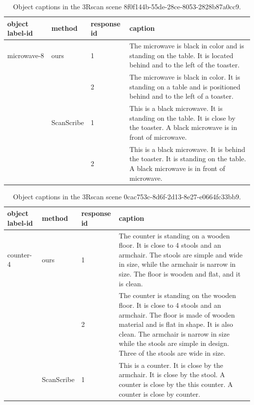 \begin{table}[htbp]
\centering
\caption{Object captions in the 3Rscan scene 8f0f144b-55de-28ce-8053-2828b87a0cc9.}
\label{tab:grammar_compare_1}
\begin{tabular}{@{}l|l|l|p{10cm}}
\toprule
object label-id & method     & response id & caption                                                                                      \\ \midrule
microwave-8     & ours       & 1           & The microwave is black in color and is standing on the table. It is located behind and to the left of the toaster. \\ \cmidrule(lr){3-4}
                &            & 2           & The microwave is black in color. It is standing on a table and is positioned behind and to the left of a toaster.   \\ \cmidrule(lr){2-4}
                & ScanScribe & 1           & This is a black microwave. It is standing on the table. It is close by the toaster. A black microwave is in front of {\color{red}{the this}} microwave. \\ \cmidrule(lr){3-4}
                &            & 2           & This is a black microwave. It is behind the toaster. It is standing on the table. A black microwave is in front of {\color{red}{the this}} microwave.   \\ \bottomrule
\end{tabular}
\end{table}


\begin{table}[htbp]
\centering
\caption{Object captions in the 3Rscan scene 0cac753c-8d6f-2d13-8e27-e0664fc33bb9.}
\label{tab:grammar_compare_2}
\begin{tabular}{@{}l|l|l|p{10cm}}
\toprule
object label-id & method     & response id & caption                                                                                      \\ \midrule
counter-4    & ours       & 1           & The counter is standing on a wooden floor. It is close to 4 stools and an armchair. The stools are simple and wide in size, while the armchair is narrow in size. The floor is wooden and flat, and it is clean. \\ \cmidrule(lr){3-4}
                &            & 2           & The counter is standing on the wooden floor. It is close to 4 stools and an armchair. The floor is made of wooden material and is flat in shape. It is also clean. The armchair is narrow in size while the stools are simple in design. Three of the stools are wide in size.   \\ \cmidrule(lr){2-4}
                & ScanScribe & 1           & This is a counter. It is close by the armchair. It is close by the stool. A counter is close by the this counter. A counter is close by {\color{red}{the this}} counter.
                         \\ \bottomrule
\end{tabular}
\end{table}


